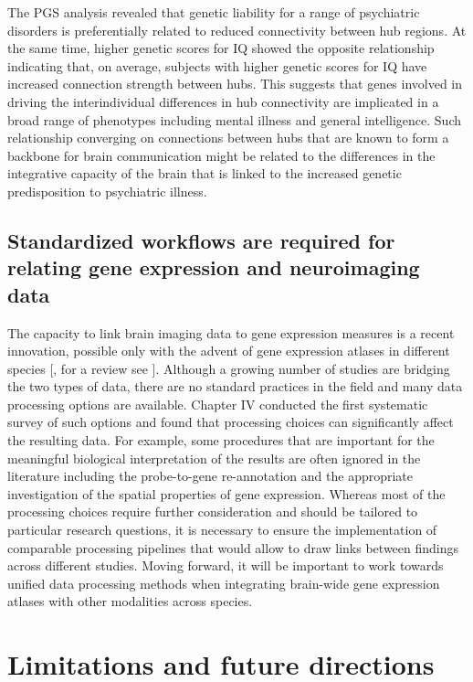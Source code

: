 The PGS analysis revealed that genetic liability for a range of psychiatric disorders is preferentially related to reduced connectivity between hub regions. At the same time, higher genetic scores for IQ showed the opposite relationship indicating that, on average, subjects with higher genetic scores for IQ have increased connection strength between hubs. This suggests that genes involved in driving the interindividual differences in hub connectivity are implicated in a broad range of phenotypes including mental illness and general intelligence. Such relationship converging on connections between hubs that are known to form a backbone for brain communication \citep{Harriger2012, VandenHeuvel2011,VandenHeuvel2013b} might be related to the differences in the integrative capacity of the brain that is linked to the increased genetic predisposition to psychiatric illness.

\subsection*{Standardized workflows are required for relating gene expression and neuroimaging data}

The capacity to link brain imaging data to gene expression measures is a recent innovation, possible only with the advent of gene expression atlases in different species [\citep{Harris2010,Hawrylycz2012,Lein2007a}, for a review see \citep{Keil2018}]. Although a growing number of studies are bridging the two types of data, there are no standard practices in the field and many data processing options are available. Chapter IV conducted the first systematic survey of such options and found that processing choices can significantly affect the resulting data. For example, some procedures that are important for the meaningful biological interpretation of the results are often ignored in the literature including the probe-to-gene re-annotation and the appropriate investigation of the spatial properties of gene expression. Whereas most of the processing choices require further consideration and should be tailored to particular research questions, it is necessary to ensure the implementation of comparable processing pipelines that would allow to draw links between findings across different studies. Moving forward, it will be important to work towards unified data processing methods when integrating brain-wide gene expression atlases with other modalities across species.

\section{Limitations and future directions}

